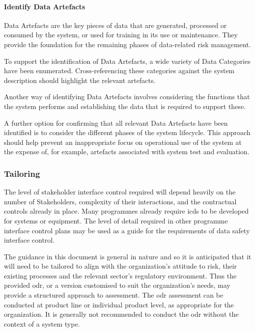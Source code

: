 \paragraph{Identify Data Artefacts}
Data Artefacts are the key pieces of data that are generated, processed or consumed by the system, or used for training in its use or maintenance. They provide the foundation for the remaining phases of data-related risk management.

To support the identification of Data Artefacts, a wide variety of Data Categories have been enumerated. Cross-referencing these categories against the system description should highlight the relevant artefacts. 

Another way of identifying Data Artefacts involves considering the functions that the system performs and establishing the data that is required to support these.

A further option for confirming that all relevant Data Artefacts have been identified is to consider the different phases of the system lifecycle. This approach should help prevent an inappropriate focus on operational use of the system at the expense of, for example, artefacts associated with system test and evaluation.

\subsubsection{Tailoring}
The level of
stakeholder
interface control required will depend heavily on the number of Stakeholders, complexity of their interactions, and the contractual controls already in place. Many programmes already require \glspl{icd} to be developed for systems or equipment. The level of detail required in other programme interface control plans may be used as a guide for the requirements of data safety interface control. 

The guidance in this document is general in nature and so it is anticipated that it will need to be tailored to align with the organization's attitude to risk, their existing processes and the relevant sector's regulatory environment. Thus the provided \gls{odr}, or a version customised to suit the organization's needs, may provide a structured approach to assessment.
The \gls{odr} assessment can be conducted at product line or individual product level, as appropriate for the organization. It is generally not recommended to conduct the \gls{odr} without the context of a system type.

